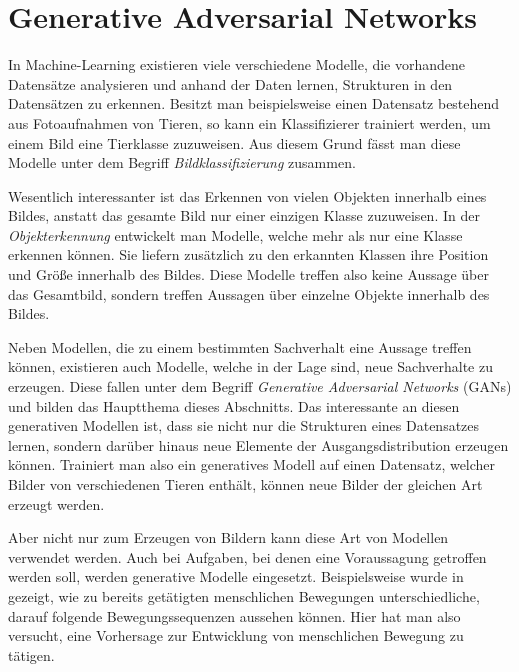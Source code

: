 \chapter{Generative Adversarial Networks}\label{chapter:gans}
In Machine-Learning existieren viele verschiedene Modelle, die vorhandene
Datensätze analysieren und anhand der Daten lernen, Strukturen in den
Datensätzen zu erkennen.  Besitzt man beispielsweise einen Datensatz
bestehend aus Fotoaufnahmen von Tieren, so kann ein Klassifizierer trainiert
werden, um einem Bild eine Tierklasse zuzuweisen. Aus diesem Grund fässt man
diese Modelle unter dem Begriff \textit{Bildklassifizierung} zusammen.

Wesentlich interessanter ist das Erkennen von vielen Objekten innerhalb eines
Bildes, anstatt das gesamte Bild nur einer einzigen Klasse zuzuweisen. In der
\textit{Objekterkennung} entwickelt man Modelle, welche mehr als nur eine
Klasse erkennen können. Sie liefern zusätzlich zu den erkannten Klassen ihre
Position und Größe innerhalb des Bildes. Diese Modelle treffen also keine
Aussage über das Gesamtbild, sondern treffen Aussagen über einzelne Objekte
innerhalb des Bildes.

Neben Modellen, die zu einem bestimmten Sachverhalt eine Aussage treffen
können, existieren auch Modelle, welche in der Lage sind, neue Sachverhalte zu
erzeugen. Diese fallen unter dem Begriff \textit{Generative Adversarial
Networks} (GANs) und bilden das Hauptthema dieses Abschnitts. Das interessante
an diesen generativen Modellen ist, dass sie nicht nur die Strukturen eines
Datensatzes lernen, sondern darüber hinaus neue Elemente der
Ausgangsdistribution erzeugen können. Trainiert man also ein generatives
Modell auf einen Datensatz, welcher Bilder von verschiedenen Tieren enthält,
können neue Bilder der gleichen Art erzeugt werden.

Aber nicht nur zum Erzeugen von Bildern kann diese Art von Modellen verwendet
werden. Auch bei Aufgaben, bei denen eine Voraussagung getroffen werden soll,
werden generative Modelle eingesetzt. Beispielsweise wurde in
\cite{barsoum2017hpgan} gezeigt, wie zu bereits getätigten menschlichen
Bewegungen unterschiedliche, darauf folgende Bewegungssequenzen aussehen
können. Hier hat man also versucht, eine Vorhersage zur Entwicklung von
menschlichen Bewegung zu tätigen.


